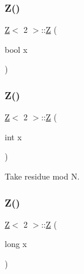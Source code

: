 \subsubsection{\texorpdfstring{Z()}{Z()}\hspace{0.1cm}{\footnotesize\ttfamily [2/5]}}
{\footnotesize\ttfamily \hyperlink{classZ}{Z}$<$ 2 $>$\+::\hyperlink{classZ}{Z} (\begin{DoxyParamCaption}\item[{bool}]{x }\end{DoxyParamCaption})\hspace{0.3cm}{\ttfamily [inline]}}

\mbox{\label{classZ_3_012_01_4_af7537f8b8e6ba15f7715354a644fb9c6}} 
\subsubsection{\texorpdfstring{Z()}{Z()}\hspace{0.1cm}{\footnotesize\ttfamily [3/5]}}
{\footnotesize\ttfamily \hyperlink{classZ}{Z}$<$ 2 $>$\+::\hyperlink{classZ}{Z} (\begin{DoxyParamCaption}\item[{int}]{x }\end{DoxyParamCaption})\hspace{0.3cm}{\ttfamily [inline]}}



Take residue mod N. 

\mbox{\label{classZ_3_012_01_4_aa57d3e40cabfe96ea16901ecda68a124}} 
\subsubsection{\texorpdfstring{Z()}{Z()}\hspace{0.1cm}{\footnotesize\ttfamily [4/5]}}
{\footnotesize\ttfamily \hyperlink{classZ}{Z}$<$ 2 $>$\+::\hyperlink{classZ}{Z} (\begin{DoxyParamCaption}\item[{long}]{x }\end{DoxyParamCaption})\hspace{0.3cm}{\ttfamily [inline]}}

\mbox{\label{classZ_3_012_01_4_a59bbd8b973581a967e8af5d3136ae439}} 
